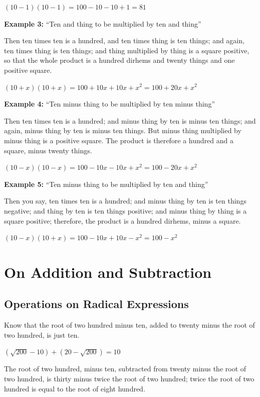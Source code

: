 \documentclass[11pt,a4paper,openany,oneside]{book}
\begin{document}
$(10 - 1)(10 - 1) = 100 - 10 - 10 + 1 = 81$

\textbf{Example 3:} ``Ten and thing to be multiplied by ten and thing''

Then ten times ten is a hundred, and ten times thing is ten things; and
again, ten times thing is ten things; and thing multiplied by thing is a
square positive, so that the whole product is a hundred dirhems and twenty
things and one positive square.

$(10 + x)(10 + x) = 100 + 10x + 10x + x^2 = 100 + 20x + x^2$

\textbf{Example 4:} ``Ten minus thing to be multiplied by ten minus thing''

Then ten times ten is a hundred; and minus thing by ten is minus ten things;
and again, minus thing by ten is minus ten things. But minus thing
multiplied by minus thing is a positive square. The product is therefore a
hundred and a square, minus twenty things.

$(10 - x)(10 - x) = 100 - 10x - 10x + x^2 = 100 - 20x + x^2$

\textbf{Example 5:} ``Ten minus thing to be multiplied by ten and thing''

Then you say, ten times ten is a hundred; and minus thing by ten is ten
things negative; and thing by ten is ten things positive; and minus thing by
thing is a square positive; therefore, the product is a hundred dirhems,
minus a square.

$(10 - x)(10 + x) = 100 - 10x + 10x - x^2 = 100 - x^2$

\newpage

\chapter{On Addition and Subtraction}
\label{ch:addition}

\section{Operations on Radical Expressions}

Know that the root of two hundred minus ten, added to twenty minus the root
of two hundred, is just ten.

$(\sqrt{200} - 10) + (20 - \sqrt{200}) = 10$

The root of two hundred, minus ten, subtracted from twenty minus the root of
two hundred, is thirty minus twice the root of two hundred; twice the root of
two hundred is equal to the root of eight hundred.
\end{document}
